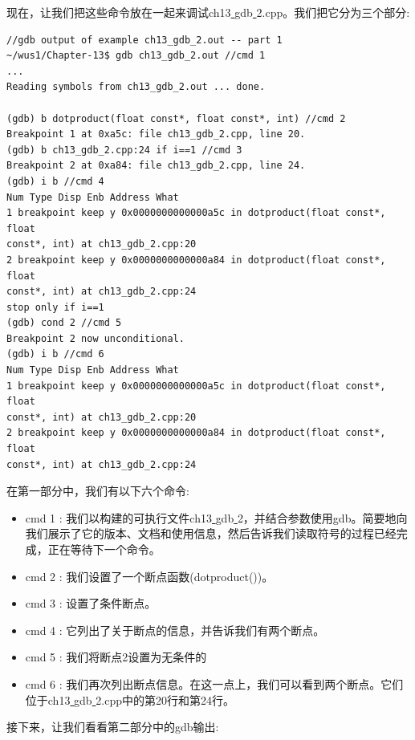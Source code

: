 现在，让我们把这些命令放在一起来调试ch13\underline{ }gdb\underline{ }2.cpp。我们把它分为三个部分: \par
\begin{lstlisting}[caption={}]
//gdb output of example ch13_gdb_2.out -- part 1
~/wus1/Chapter-13$ gdb ch13_gdb_2.out //cmd 1
...
Reading symbols from ch13_gdb_2.out ... done.

(gdb) b dotproduct(float const*, float const*, int) //cmd 2
Breakpoint 1 at 0xa5c: file ch13_gdb_2.cpp, line 20.
(gdb) b ch13_gdb_2.cpp:24 if i==1 //cmd 3
Breakpoint 2 at 0xa84: file ch13_gdb_2.cpp, line 24.
(gdb) i b //cmd 4
Num Type Disp Enb Address What
1 breakpoint keep y 0x0000000000000a5c in dotproduct(float const*, float
const*, int) at ch13_gdb_2.cpp:20
2 breakpoint keep y 0x0000000000000a84 in dotproduct(float const*, float
const*, int) at ch13_gdb_2.cpp:24
stop only if i==1
(gdb) cond 2 //cmd 5
Breakpoint 2 now unconditional.
(gdb) i b //cmd 6
Num Type Disp Enb Address What
1 breakpoint keep y 0x0000000000000a5c in dotproduct(float const*, float
const*, int) at ch13_gdb_2.cpp:20
2 breakpoint keep y 0x0000000000000a84 in dotproduct(float const*, float
const*, int) at ch13_gdb_2.cpp:24
\end{lstlisting}

在第一部分中，我们有以下六个命令: \par

\begin{itemize}
	\item cmd 1 : 我们以构建的可执行文件ch13\underline{ }gdb\underline{ }2，并结合参数使用gdb。简要地向我们展示了它的版本、文档和使用信息，然后告诉我们读取符号的过程已经完成，正在等待下一个命令。
	\item cmd 2 : 我们设置了一个断点函数(dotproduct())。
	\item cmd 3 : 设置了条件断点。
	\item cmd 4 : 它列出了关于断点的信息，并告诉我们有两个断点。
	\item cmd 5 : 我们将断点2设置为无条件的
	\item cmd 6 : 我们再次列出断点信息。在这一点上，我们可以看到两个断点。它们位于ch13\underline{ }gdb\underline{ }2.cpp中的第20行和第24行。
\end{itemize}

接下来，让我们看看第二部分中的gdb输出: \par


